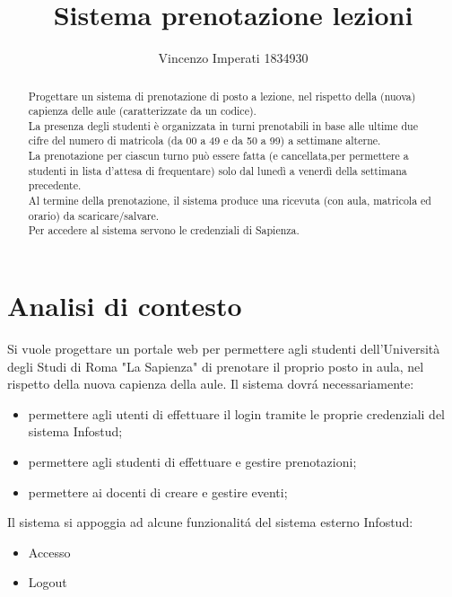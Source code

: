 \documentclass[11pt]{article}
\title{\textbf{Sistema prenotazione lezioni}}
\author{Vincenzo Imperati 1834930}
\date{}
\begin{document}
\maketitle
\thispagestyle{empty}


\begin{abstract}
Progettare un sistema di prenotazione di posto a lezione, nel rispetto della (nuova) capienza delle aule (caratterizzate da un codice).
\\\indent
La presenza degli studenti è organizzata in turni prenotabili in base alle ultime due cifre del numero di matricola (da 00 a 49 e da 50 a 99) a settimane alterne.
\\\indent
La prenotazione per ciascun turno può essere fatta (e cancellata,per permettere a studenti in lista d’attesa di frequentare) solo dal lunedì a venerdì della settimana precedente.
\\\indent
Al termine della prenotazione, il sistema produce una ricevuta (con aula, matricola ed orario) da scaricare/salvare.
\\\indent
Per accedere al sistema servono le credenziali di Sapienza.
\end{abstract}

\newpage
\tableofcontents
\newpage

\section{Analisi di contesto}
Si vuole progettare un portale web per permettere agli studenti dell'Università degli Studi di Roma "La Sapienza" di prenotare il proprio posto in aula, nel rispetto della nuova capienza della aule.
Il sistema dovrá necessariamente:
\begin{itemize}
\itemsep0em
\item permettere agli utenti di effettuare il login tramite le proprie credenziali del sistema Infostud;
\item permettere agli studenti di effettuare e gestire prenotazioni;
\item permettere ai docenti di creare e gestire eventi;
\end{itemize}
Il sistema si appoggia ad alcune funzionalitá del sistema esterno Infostud:
\begin{itemize}
\itemsep0em
\item Accesso
\item Logout
\end{itemize}
\end{document}
